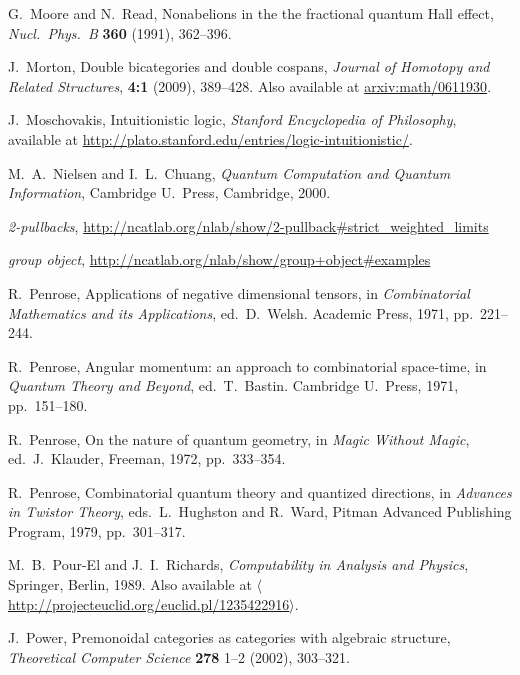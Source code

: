 \documentclass[12pt,twoside,openright]{report}
\begin{document}
\begin{thebibliography}{99}
 G.\ Moore and N.\ Read, Nonabelions in the the fractional quantum Hall effect, {\sl Nucl.\ Phys.\ B} 
{\bf 360} (1991), 362--396.

 J.\ Morton, Double bicategories and double cospans, \textsl{Journal of Homotopy and Related Structures}, \textbf{4:1} (2009), 389--428.  Also available at \href{http://arxiv.org/abs/math/0611930}{arxiv:math/0611930}.

 J.\ Moschovakis, Intuitionistic logic,
{\sl Stanford Encyclopedia of Philosophy}, available at \hfill \break
\href{http://plato.stanford.edu/entries/logic-intuitionistic/}
{http://plato.stanford.edu/entries/logic-intuitionistic/}.

 M.\ A.\ Nielsen and I.\ L.\ Chuang,
{\sl Quantum Computation and Quantum Information}, Cambridge U.\ 
Press, Cambridge, 2000.

 {\sl 2-pullbacks}, 
\href{http://ncatlab.org/nlab/show/2-pullback#strict_weighted_limits}
{http://ncatlab.org/nlab/show/2-pullback\#strict\_weighted\_limits}

 {\sl group object}, 
\href{http://ncatlab.org/nlab/show/group+object#examples}
{http://ncatlab.org/nlab/show/group+object\#examples}
 
R.\ Penrose, Applications of negative dimensional tensors, in \textsl{Combinatorial Mathematics and its Applications}, ed.\
D.~Welsh. Academic Press, 1971, pp.\ 221--244.

R.\ Penrose, Angular momentum: an approach to combinatorial space-time, in \textsl{Quantum Theory and Beyond}, ed.\
T.~Bastin. Cambridge U.\ Press, 1971, pp.\ 151--180.

R.\ Penrose, On the nature of quantum geometry, in \textsl{Magic Without Magic}, ed.\ J.\ Klauder, Freeman, 1972, pp.\ 333--354.

R.\ Penrose, Combinatorial quantum theory and quantized directions, in \textsl{Advances in Twistor Theory}, eds.\ L.\ Hughston and R.\ Ward, Pitman Advanced Publishing Program, 1979, pp.\ 301--317.

 M.\ B.\ Pour-El and J.\ I.\ Richards,
\textsl{Computability in Analysis and Physics}, Springer, Berlin, 1989. Also available at \href{http://projecteuclid.org/euclid.pl/1235422916}
{$\langle$http://projecteuclid.org/euclid.pl/1235422916$\rangle$}.

\bibitem{PowerTCS} J.\ Power, Premonoidal categories as categories with algebraic structure, \textsl{Theoretical Computer Science} \textbf{278} 1--2 (2002), 303--321.


\end{thebibliography}
\end{document}
